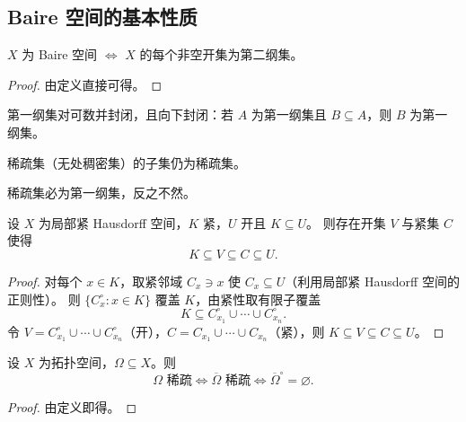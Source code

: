 \documentclass[lang=cn,a4paper,newtx,figureplace=section,tableplace=section]{elegantbook}
\begin{document}
\subsection{Baire 空间的基本性质}

\begin{proposition}\label{prop:baire-equiv-second-category}
  $X$ 为 Baire 空间 $\Leftrightarrow$ $X$ 的每个非空开集为第二纲集。
\end{proposition}
\begin{proof}
  由定义直接可得。
\end{proof}

\begin{proposition}\label{prop:first-category-properties}
  第一纲集对可数并封闭，且向下封闭：若 $A$ 为第一纲集且 $B\subseteq A$，则 $B$ 为第一纲集。
\end{proposition}

\begin{proposition}\label{prop:nowhere-dense-subset}
  稀疏集（无处稠密集）的子集仍为稀疏集。
\end{proposition}

\begin{proposition}\label{prop:nowhere-dense-impl-first-category}
  稀疏集必为第一纲集，反之不然。
\end{proposition}

\begin{proposition}\label{prop:locally-compact-sandwich}
  设 $X$ 为局部紧 Hausdorff 空间，$K$ 紧，$U$ 开且 $K\subseteq U$。
  则存在开集 $V$ 与紧集 $C$ 使得
  \[
    K\subseteq V\subseteq C\subseteq U.
  \]
\end{proposition}
\begin{proof}
  对每个 $x\in K$，取紧邻域 $C_x\ni x$ 使 $C_x\subseteq U$（利用局部紧 Hausdorff 空间的正则性）。
  则 $\{C_x^\circ:x\in K\}$ 覆盖 $K$，由紧性取有限子覆盖
  \[
    K\subseteq C_{x_1}^\circ\cup\cdots\cup C_{x_n}^\circ.
  \]
  令 $V=C_{x_1}^\circ\cup\cdots\cup C_{x_n}^\circ$（开），$C=C_{x_1}\cup\cdots\cup C_{x_n}$（紧），则 $K\subseteq V\subseteq C\subseteq U$。
\end{proof}

\begin{proposition}\label{prop:baire-nowhere-dense-closure}
  设 $X$ 为拓扑空间，$\Omega\subseteq X$。则
  \[
    \Omega\text{ 稀疏}\Leftrightarrow\overline\Omega\text{ 稀疏}\Leftrightarrow\overline\Omega^\circ=\varnothing.
  \]
\end{proposition}
\begin{proof}
  由定义即得。
\end{proof}
\end{document}
